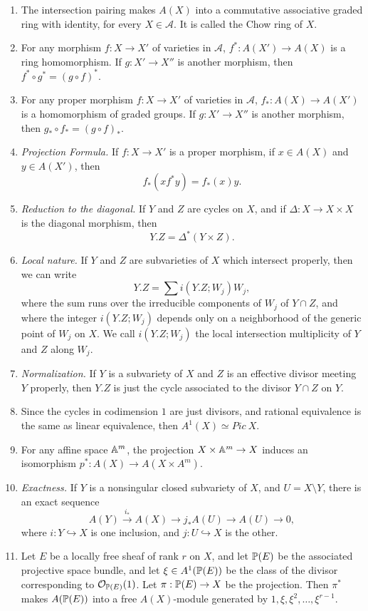 \documentclass[
	oldfontcommands,
	sumario=abnt-6027-2012,
	12pt,			%
	openright,		%
	oneside,		%
	a4paper,		%
	english,		%
	brazil			%
	]{imecc-unicamp}
\begin{document}
\begin{enumerate}
	\item The intersection pairing makes $A(X)$ into a commutative associative graded ring with identity, for every $X\in \mathcal A$. It is called the Chow ring of $X$.
	\item For any morphism $f:X\rightarrow X'$ of varieties in $\mathcal A$, $f^*:A(X')\rightarrow A(X)$ is a ring homomorphism. If $g:X'\rightarrow X''$ is another morphism, then $f^*\circ g^*=(g\circ f)^*$.
	\item For any proper morphism $f:X\rightarrow X'$ of varieties in $\mathcal A$, $f_*:A(X)\rightarrow A(X')$ is a homomorphism of graded groups. If $g:X'\rightarrow X''$ is another morphism, then $g_*\circ f_*=(g\circ f)_*$.
	\item \emph{Projection Formula.} If $f:X\rightarrow X'$ is a proper morphism, if $x\in A(X)$ and $y\in A(X')$, then $$
	f_*(xf^*y)=f_*(x)y.
	$$
	\item \emph{Reduction to the diagonal.} If $Y$ and $Z$ are cycles on $X$, and if $\Delta:X\rightarrow X\times X$ is the diagonal morphism, then $$
	Y.Z=\Delta^*(Y\times Z).
	$$
	\item \emph{Local nature.} If $Y$ and $Z$ are subvarieties of $X$ which intersect properly, then we can write $$Y.Z=\sum i(Y.Z;W_j)W_j,$$ where the sum runs over the irreducible components of $W_j$ of $Y\cap Z$, and where the integer $i(Y.Z;W_j)$ depends only on a neighborhood of the generic point of $W_j$ on $X$. We call $i(Y.Z;W_j)$ the local intersection multiplicity of $Y$ and $Z$ along $W_j$.
	\item \emph{Normalization.} If $Y$ is a subvariety of $X$ and $Z$ is an effective divisor meeting $Y$ properly, then $Y.Z$ is just the cycle associated to the divisor $Y\cap Z$ on $Y$. 
	\item Since the cycles in codimension $1$ are just divisors, and rational equivalence is the same as linear equivalence, then $A^1(X)\simeq Pic~X$.
	\item For any affine space ${\mathbb A}^m$, the projection $X\times {\mathbb A}^m\rightarrow X$ induces an isomorphism $p^*:A(X)\rightarrow A(X\times A^m)$.
	\item \emph{Exactness.} If $Y$ is a nonsingular closed subvariety of $X$, and $U=X\setminus Y$, there is an exact sequence $$
	A(Y)\xrightarrow{i_*} A(X)\rightarrow{j_*}A(U)\rightarrow A(U)\rightarrow 0, 
	$$
	where $i:Y\hookrightarrow X$ is one inclusion, and $j:U\hookrightarrow X$ is the other.
	\item Let $E$ be a locally free sheaf of rank $r$ on $X$, and let ${\mathbb P}(E)$ be the associated projective space bundle, and let $\xi\in A^1({\mathbb P}(E))$ be the class of the divisor corresponding to ${\mathcal O}_{{\mathbb P}(E)}(1)$. Let $\pi:{\mathbb P}(E)\rightarrow X$ be the projection. Then $\pi^*$ makes $A({\mathbb P}(E))$ into a free $A(X)$-module generated by $1,\xi,\xi^2,\dots,\xi^{r-1}$.
\end{enumerate}
\end{document}
